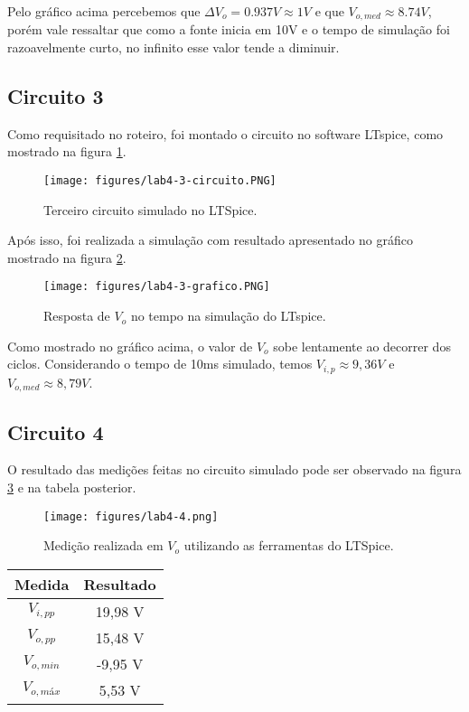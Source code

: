 \documentclass[a4paper]{report}
\begin{document}
Pelo gráfico acima percebemos que $\Delta V_o = 0.937V \approx 1V$ e que $V_{o,med} \approx 8.74V$, porém vale ressaltar que como a fonte inicia em 10V e o tempo de simulação foi razoavelmente curto, no infinito esse valor tende a diminuir.

\subsection{Circuito 3}

Como requisitado no roteiro, foi montado o circuito no software LTspice, como mostrado na figura \ref{fig:figures-lab4-3-circuito-png}.

\begin{figure}[H]
    \centering
    \texttt{[image: figures/lab4-3-circuito.PNG]}
    \caption{Terceiro circuito simulado no LTSpice.}
    \label{fig:figures-lab4-3-circuito-png}
\end{figure}

Após isso, foi realizada a simulação com resultado apresentado no gráfico mostrado na figura \ref{fig:figures-lab4-3-grafico-png}.

\begin{figure}[H]
    \centering
    \texttt{[image: figures/lab4-3-grafico.PNG]}
    \caption{Resposta de $V_o$ no tempo na simulação do LTspice.}
    \label{fig:figures-lab4-3-grafico-png}
\end{figure}

Como mostrado no gráfico acima, o valor de $V_o$ sobe lentamente ao decorrer dos ciclos. Considerando o tempo de 10ms simulado, temos $V_{i,p} \approx 9,36V$ e $V_{o,med} \approx 8,79V$.

\subsection{Circuito 4}

O resultado das medições feitas no circuito simulado pode ser observado na figura \ref{fig:figures-lab4-4-png} e na tabela posterior.

\begin{figure}[H]
    \centering
    \texttt{[image: figures/lab4-4.png]}
    \caption{Medição realizada em $V_o$ utilizando as ferramentas do LTSpice.}
    \label{fig:figures-lab4-4-png}
\end{figure}

\begin{table}[H]
    \centering
    \begin{tabular}{c | c}
	Medida & Resultado \\
	\hline
	$V_{i,pp}$ & 19,98 V \\
	$V_{o,pp}$ & 15,48 V \\
	$V_{o,min}$ & -9,95 V \\
	$V_{o,máx}$ & 5,53 V \\
    \end{tabular}
\end{table}
\end{document}
